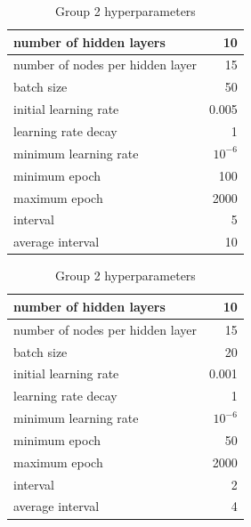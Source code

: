 \documentclass{article}
\numberwithin{equation}{section}
\begin{document}
\begin{table}[h]
    \parbox{.45\linewidth}{
        \centering
        \begin{tabular}{|l|r|}
        \hline
        number of hidden layers & 10 \\ \hline
        number of nodes per hidden layer & 15 \\ \hline
        batch size & 50 \\ \hline
        initial learning rate & 0.005 \\ \hline
        learning rate decay & 1 \\ \hline
        minimum learning rate & $10^{-6}$ \\ \hline
        minimum epoch & 100 \\ \hline
        maximum epoch & 2000 \\ \hline
        interval & 5 \\ \hline 
        average interval & 10 \\ \hline 
        \end{tabular}
        \caption{Group 1 hyperparameters}
        \label{tab:hyperparam_group1}
    }
    \hfill
    \parbox{.45\linewidth}{
        \centering
        \begin{tabular}{|l|r|}
        \hline
        number of hidden layers & 10 \\ \hline
        number of nodes per hidden layer & 15 \\ \hline
        batch size & 20 \\ \hline
        initial learning rate & 0.001 \\ \hline
        learning rate decay & 1 \\ \hline
        minimum learning rate & $10^{-6}$ \\ \hline
        minimum epoch & 50 \\ \hline
        maximum epoch & 2000 \\ \hline
        interval & 2 \\ \hline 
        average interval & 4 \\ \hline 
        \end{tabular}
        \caption{Group 2 hyperparameters}
        \label{tab:hyperparam_group2}
    }
\end{table}
\end{document}
